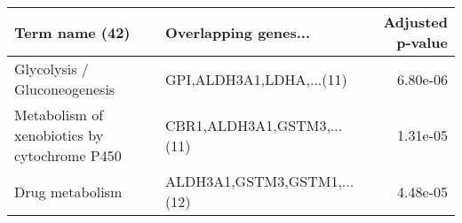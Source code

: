 \begin{tabular}{llr}
\toprule
                              Term name (42) &        Overlapping genes... &  Adjusted p-value \\
\midrule
                Glycolysis / Gluconeogenesis &    GPI,ALDH3A1,LDHA,...(11) &          6.80e-06 \\
Metabolism of xenobiotics by cytochrome P450 &  CBR1,ALDH3A1,GSTM3,...(11) &          1.31e-05 \\
                             Drug metabolism & ALDH3A1,GSTM3,GSTM1,...(12) &          4.48e-05 \\
\bottomrule
\end{tabular}
